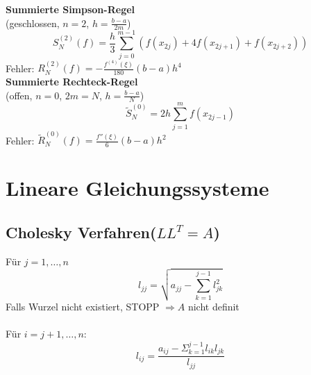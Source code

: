 \documentclass[
ngerman,
accentcolor=9c,%
type=intern,
marginpar=false
]{tudapub}
\begin{document}
            \textbf{Summierte Simpson-Regel}\\
            (geschlossen, $n = 2$, $h=\frac{b-a}{2m}$)
            \begin{equation*}
                S^{(2)}_N(f)=\dfrac{h}{3}\sum^{m-1}_{j=0}(f(x_{2j}) + 4f(x_{2j+1}) + f(x_{2j+2}))
            \end{equation*}
            Fehler: $R^{(2)}_N(f)=-\frac{f^{(4)}(\xi)}{180}(b-a)h^4$\\[2ex]

            \textbf{Summierte Rechteck-Regel}\\
            (offen, $n=0$, $2m = N$, $h = \frac{b-a}{N}$)
            \begin{equation*}
                \tilde{S}_N^{(0)} = 2h \sum^m_{j=1} f(x_{2j-1})
            \end{equation*}
            Fehler: $\tilde{R}^{(0)}_N(f)= \frac{f''(\xi)}{6}(b-a)h^2$

    \newpage
    \section{Lineare Gleichungssysteme}
        \subsection{Cholesky Verfahren\hspace{1em}($LL^T = A$)}
            Für $j= 1,\dots ,n$
            \begin{equation*}
                l_{jj} =\sqrt{a_{jj}-\sum^{j-1}_{k=1}l_{jk}^2}
            \end{equation*}
            Falls Wurzel nicht existiert, STOPP $\Rightarrow A$ nicht definit\\
            \\
            \hspace{20mm} Für $i=j+1,\dots,n:$
            \begin{equation*}
                l_{ij} = \dfrac{a_{ij}-\Sigma_{k=1}^{j-1}l_{ik}l_{jk}}{l_{jj}}
            \end{equation*}
\end{document}
